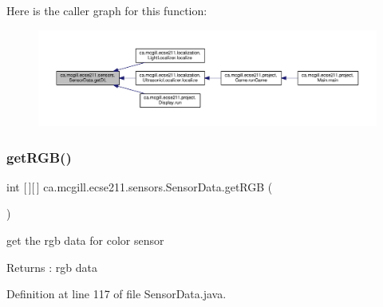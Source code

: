 Here is the caller graph for this function\+:
\nopagebreak
\begin{figure}[H]
\begin{center}
\leavevmode
\includegraphics[width=350pt]{classca_1_1mcgill_1_1ecse211_1_1sensors_1_1_sensor_data_a4e0eabd547726c90bd0b7252557d7ad7_icgraph}
\end{center}
\end{figure}
\mbox{\label{classca_1_1mcgill_1_1ecse211_1_1sensors_1_1_sensor_data_a0abd08431dae67c7ee0e7a18b5305f91}} 
\subsubsection{\texorpdfstring{get\+R\+G\+B()}{getRGB()}}
{\footnotesize\ttfamily int \mbox{[}$\,$\mbox{]}\mbox{[}$\,$\mbox{]} ca.\+mcgill.\+ecse211.\+sensors.\+Sensor\+Data.\+get\+R\+GB (\begin{DoxyParamCaption}{ }\end{DoxyParamCaption})}

get the rgb data for color sensor

\begin{DoxyReturn}{Returns}
\+: rgb data 
\end{DoxyReturn}


Definition at line 117 of file Sensor\+Data.\+java.

